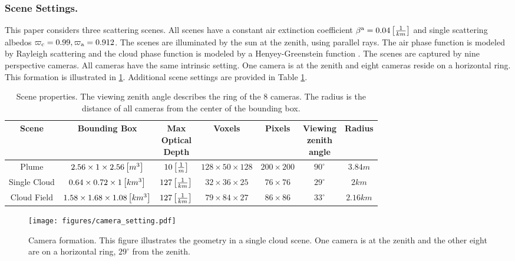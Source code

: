 \documentclass{article}
\begin{document}
\subsubsection{Scene Settings.} This paper considers three scattering scenes. 
All scenes have a constant air extinction coefficient $\beta^{\text{a}}=0.04\left[{\frac{1}{km}}\right]$ and single scattering albedos $\varpi_{\text{c}}=0.99, \varpi_{\text{a}}=0.912$. The scenes are illuminated by the sun at the zenith, using parallel rays. The air phase function is modeled by Rayleigh scattering \citep{frisvad2011importance} and the cloud phase function is modeled by a Henyey-Greenstein function \citep{binzoni2006use}. The scenes are captured by nine perspective cameras. All cameras have the same intrinsic setting. One camera is at the zenith and eight cameras reside on a horizontal ring. This formation is illustrated in \fig\ref{fig:camera_setting}. Additional scene settings are provided in Table \ref{table:scene_settings}.
\begin{table}[b]
\centering
\begin{tabular}{c | c | c | c | c | c | c} 
 \hline
 Scene & Bounding Box & \thead{Max \\Optical \\Depth} & Voxels & Pixels & \thead{Viewing \\zenith \\angle} & Radius\\ [0.7ex] 
 \hline\hline 

 Plume & $2.56\times1\times 2.56 \left[{m^{3}}\right]$  & $10 \left[{\frac{1}{m}}\right]$& $128\times 50 \times 128$  & $200\times200$ & $90^{\circ}$ & $3.84m$ \\
 \hline

 Single Cloud & $0.64\times0.72\times 1 \left[{km^{3}}\right]$  &$127 \left[{\frac{1}{km}}\right]$ & $32\times 36 \times 25$  & $76\times76$  & $29^{\circ}$  & $2km$\\
  \hline
  
 Cloud Field & $1.58\times1.68\times 1.08 \left[{km^{3}}\right]$  &$127 \left[{\frac{1}{km}}\right]$&  $79\times 84 \times 27$   & $86\times86$ & $33^{\circ}$ &   $2.16km$  \\ \hline
\end{tabular}
\caption{Scene properties. The viewing zenith angle describes the ring of the 8 cameras. The radius is the distance of all cameras from the center of the bounding box.}
\label{table:scene_settings}
\end{table}

\begin{figure}[t]
  \centering
   \texttt{[image: figures/camera\_setting.pdf]} 
    \caption{Camera formation. This figure illustrates the geometry in a single cloud scene. One camera is at the zenith and the other eight are on a horizontal ring, $29^{\circ}$ from the zenith.}
    \label{fig:camera_setting}
\end{figure} 
\end{document}
